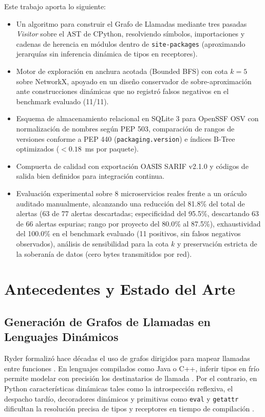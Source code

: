 \documentclass[conference]{IEEEtran}
\begin{document}
Este trabajo aporta lo siguiente:
\begin{itemize}
    \item Un algoritmo para construir el Grafo de Llamadas mediante tres pasadas \textit{Visitor} sobre el AST de CPython, resolviendo símbolos, importaciones y cadenas de herencia en módulos dentro de \texttt{site-packages} (aproximando jerarquías sin inferencia dinámica de tipos en receptores).
    \item Motor de exploración en anchura acotada (Bounded BFS) con cota $k=5$ sobre NetworkX, apoyado en un diseño conservador de sobre-aproximación ante construcciones dinámicas que no registró falsos negativos en el benchmark evaluado (11/11).
    \item Esquema de almacenamiento relacional en SQLite 3 para OpenSSF OSV con normalización de nombres según PEP 503, comparación de rangos de versiones conforme a PEP 440 (\texttt{packaging.version}) e índices B-Tree optimizados ($<0.18$~ms por paquete).
    \item Compuerta de calidad con exportación OASIS SARIF v2.1.0 y códigos de salida bien definidos para integración continua.
    \item Evaluación experimental sobre 8 microservicios reales frente a un oráculo auditado manualmente, alcanzando una reducción del 81.8\% del total de alertas (63 de 77 alertas descartadas; especificidad del 95.5\%, descartando 63 de 66 alertas espurias; rango por proyecto del 80.0\% al 87.5\%), exhaustividad del 100.0\% en el benchmark evaluado (11 positivos, sin falsos negativos observados), análisis de sensibilidad para la cota $k$ y preservación estricta de la soberanía de datos (cero bytes transmitidos por red).
\end{itemize}

\section{Antecedentes y Estado del Arte}

\subsection{Generación de Grafos de Llamadas en Lenguajes Dinámicos}
Ryder formalizó hace décadas el uso de grafos dirigidos para mapear llamadas entre funciones \cite{ryder1979constructing}. En lenguajes compilados como Java o C++, inferir tipos en frío permite modelar con precisión los destinatarios de llamada \cite{nielson1999principles}. Por el contrario, en Python características dinámicas tales como la introspección reflexiva, el despacho tardío, decoradores dinámicos y primitivas como \texttt{eval} y \texttt{getattr} dificultan la resolución precisa de tipos y receptores en tiempo de compilación \cite{salis2021pycg, sotiropoulos2023jarvis, alexopoulos2026cross}.
\end{document}
